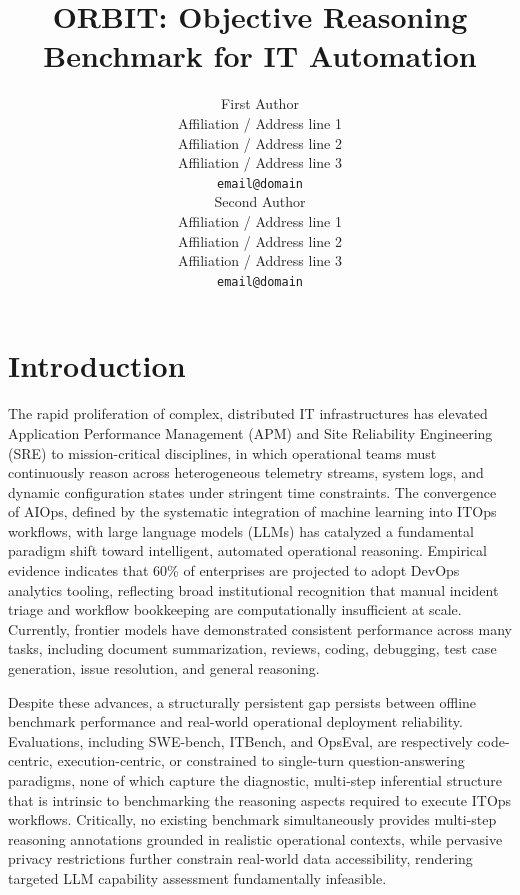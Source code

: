 \documentclass[11pt]{article}
\title{ORBIT: Objective Reasoning Benchmark for IT Automation}
\author{First Author \\
  Affiliation / Address line 1 \\
  Affiliation / Address line 2 \\
  Affiliation / Address line 3 \\
  \texttt{email@domain} \\\And
  Second Author \\
  Affiliation / Address line 1 \\
  Affiliation / Address line 2 \\
  Affiliation / Address line 3 \\
  \texttt{email@domain} \\}
\begin{document}
\maketitle
\begin{abstract}

\end{abstract}

\section{Introduction}\label{sec1}


The rapid proliferation of complex, distributed IT infrastructures has elevated Application Performance Management (APM) and Site Reliability Engineering (SRE) to mission-critical disciplines, in which operational teams must continuously reason across heterogeneous telemetry streams, system logs, and dynamic configuration states under stringent time constraints. The convergence of AIOps, defined by the systematic integration of machine learning into ITOps workflows, with large language models (LLMs) has catalyzed a fundamental paradigm shift toward intelligent, automated operational reasoning. Empirical evidence indicates that 60\% of enterprises are projected to adopt DevOps analytics tooling, reflecting broad institutional recognition that manual incident triage and workflow bookkeeping are computationally insufficient at scale. Currently, frontier models have demonstrated consistent performance across many tasks, including document summarization, reviews, coding, debugging, test case generation, issue resolution, and general reasoning. 

Despite these advances, a structurally persistent gap persists between offline benchmark performance and real-world operational deployment reliability. Evaluations, including SWE-bench, ITBench, and OpsEval, are respectively code-centric, execution-centric, or constrained to single-turn question-answering paradigms, none of which capture the diagnostic, multi-step inferential structure that is intrinsic to benchmarking the reasoning aspects required to execute ITOps workflows. Critically, no existing benchmark simultaneously provides multi-step reasoning annotations grounded in realistic operational contexts, while pervasive privacy restrictions further constrain real-world data accessibility, rendering targeted LLM capability assessment fundamentally infeasible.
\end{document}
